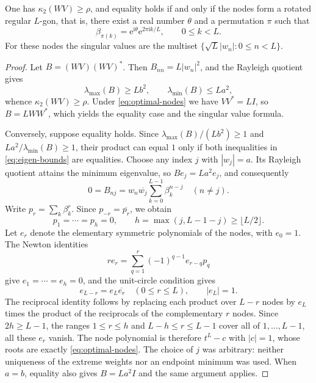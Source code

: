 \documentclass[10pt,twoside,final]{siamart1116}
\numberwithin{equation}{section}
\numberwithin{theorem}{section}
\newcommand{\cond}{\kappa_2}
\newcommand{\e}{\mathrm e}
\newcommand{\ii}{\mathrm i}
\begin{document}
\begin{theorem}
\label{thm:weighted}
One has $\cond(WV)\ge\rho$, and equality holds if and only if the nodes form a rotated
regular $L$-gon, that is, there exist a real number $\theta$ and a permutation $\pi$
such that
\begin{equation}\label{eq:optimal-nodes}
\beta_{\pi(k)}=\e^{\ii\theta}\e^{2\pi\ii k/L},\qquad 0\le k<L.
\end{equation}
For these nodes the singular values are the multiset $\{\sqrt L|w_n|:0\le n<L\}$.
\end{theorem}
\begin{proof}
Let $B=(WV)(WV)^*$. Then $B_{nn}=L|w_n|^2$, and the Rayleigh quotient gives
\begin{equation}\label{eq:eigen-bounds}
\lambda_{\max}(B)\ge Lb^2,\qquad \lambda_{\min}(B)\le La^2,
\end{equation}
whence $\cond(WV)\ge\rho$. Under \eqref{eq:optimal-nodes} we have $VV^*=LI$, so
$B=LWW^*$, which yields the equality case and the singular value formula.

Conversely, suppose equality holds. Since
$\lambda_{\max}(B)/(Lb^2)\ge1$ and $La^2/\lambda_{\min}(B)\ge1$,
their product can equal $1$ only if both inequalities in
\eqref{eq:eigen-bounds} are equalities. Choose any index $j$ with $|w_j|=a$. Its Rayleigh quotient attains the
minimum eigenvalue, so
$Be_j=La^2e_j$, and consequently
\[
0=B_{nj}=w_n\overline{w_j}\sum_{k=0}^{L-1}\beta_k^{n-j}\quad(n\ne j).
\]
Write $p_r=\sum_k\beta_k^r$. Since $p_{-r}=\overline{p_r}$, we obtain
\[
p_1=\cdots=p_h=0,\qquad h=\max(j,L-1-j)\ge\lfloor L/2\rfloor.
\]
Let $e_r$ denote the elementary symmetric polynomials of the nodes, with $e_0=1$. The
Newton identities
\[
r e_r=\sum_{q=1}^r(-1)^{q-1}e_{r-q}p_q
\]
give $e_1=\cdots=e_h=0$, and the unit-circle condition gives
\[
e_{L-r}=e_L\overline{e_r}\quad(0\le r\le L),\qquad |e_L|=1.
\]
The reciprocal identity follows by replacing each product over $L-r$ nodes by
$e_L$ times the product of the reciprocals of the complementary $r$ nodes.
Since $2h\ge L-1$, the ranges $1\le r\le h$ and $L-h\le r\le L-1$ cover all of $1,\ldots,L-1$, all
these $e_r$ vanish. The node polynomial is therefore $t^L-c$ with $|c|=1$, whose roots
are exactly \eqref{eq:optimal-nodes}.
The choice of $j$ was arbitrary: neither uniqueness of the extreme weights nor an
endpoint minimum was used. When $a=b$, equality also gives $B=La^2I$ and the same
argument applies.
\end{proof}
\end{document}
